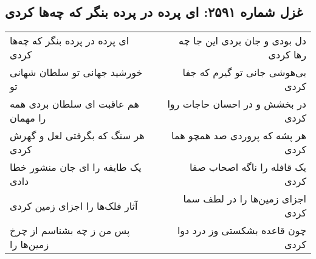 \begin{center}
\section*{غزل شماره ۲۵۹۱: ای پرده در پرده بنگر که چه‌ها کردی}
\label{sec:2591}
\begin{longtable}{l p{0.5cm} r}
ای پرده در پرده بنگر که چه‌ها کردی
&&
دل بودی و جان بردی این جا چه رها کردی
\\
خورشید جهانی تو سلطان شهانی تو
&&
بی‌هوشی جانی تو گیرم که جفا کردی
\\
هم عاقبت ای سلطان بردی همه را مهمان
&&
در بخشش و در احسان حاجات روا کردی
\\
هر سنگ که بگرفتی لعل و گهرش کردی
&&
هر پشه که پروردی صد همچو هما کردی
\\
یک طایفه را ای جان منشور خطا دادی
&&
یک قافله را ناگه اصحاب صفا کردی
\\
آثار فلک‌ها را اجزای زمین کردی
&&
اجزای زمین‌ها را در لطف سما کردی
\\
پس من ز چه بشناسم از چرخ زمین‌ها را
&&
چون قاعده بشکستی وز درد دوا کردی
\\
\end{longtable}
\end{center}
